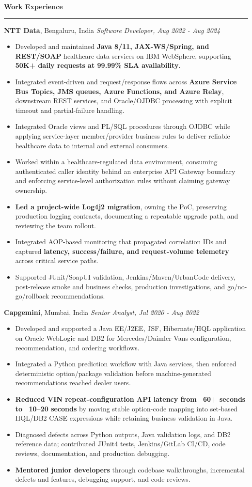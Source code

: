 \documentclass[11pt,letterpaper]{article}
\newcommand{\ressection}[1]{\Needspace{6\baselineskip}\vspace{8pt}\par\textbf{#1}\par\vspace{2pt}\hrule\vspace{5pt}}
\begin{document}
\ressection{Work Experience}
\textbf{NTT Data}, Bengaluru, India \hfill \textit{Software Developer, Aug 2022 - Aug 2024}
\begin{itemize}
  \item Developed and maintained \textbf{Java 8/11, JAX-WS/Spring, and REST/SOAP} healthcare data services on IBM WebSphere, supporting \textbf{50K+ daily requests at 99.99\% SLA availability}.
  \item Integrated event-driven and request/response flows across \textbf{Azure Service Bus Topics, JMS queues, Azure Functions, and Azure Relay}, downstream REST services, and Oracle/OJDBC processing with explicit timeout and partial-failure handling.
  \item Integrated Oracle views and PL/SQL procedures through OJDBC while applying service-layer member/provider business rules to deliver reliable healthcare data to internal and external consumers.
  \item Worked within a healthcare-regulated data environment, consuming authenticated caller identity behind an enterprise API Gateway boundary and enforcing service-level authorization rules without claiming gateway ownership.
  \item \textbf{Led a project-wide Log4j2 migration}, owning the PoC, preserving production logging contracts, documenting a repeatable upgrade path, and reviewing the team rollout.
  \item Integrated AOP-based monitoring that propagated correlation IDs and captured \textbf{latency, success/failure, and request-volume telemetry} across critical service paths.
  \item Supported JUnit/SoapUI validation, Jenkins/Maven/UrbanCode delivery, post-release smoke and business checks, production investigations, and go/no-go/rollback recommendations.
\end{itemize}
\textbf{Capgemini}, Mumbai, India \hfill \textit{Senior Analyst, Jul 2020 - Aug 2022}
\begin{itemize}
  \item Developed and supported a Java EE/J2EE, JSF, Hibernate/HQL application on Oracle WebLogic and DB2 for Mercedes/Daimler Vans configuration, recommendation, and ordering workflows.
  \item Integrated a Python prediction workflow with Java services, then enforced deterministic option/package validation before machine-generated recommendations reached dealer users.
  \item \textbf{Reduced VIN repeat-configuration API latency from ~60+ seconds to ~10--20 seconds} by moving stable option-code mapping into set-based HQL/DB2 CASE expressions while retaining business validation in Java.
  \item Diagnosed defects across Python outputs, Java validation logs, and DB2 reference data; contributed JUnit4 tests, Jenkins/GitLab CI/CD, code reviews, documentation, and production debugging.
  \item \textbf{Mentored junior developers} through codebase walkthroughs, incremental defects and features, debugging support, and code reviews.
\end{itemize}
\end{document}
